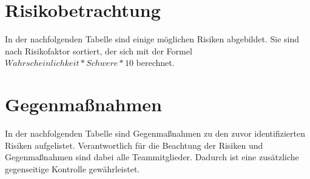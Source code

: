 
\newcommand{\Titel}{Risikoanalyse}


\section{Risikobetrachtung}
In der nachfolgenden Tabelle sind einige möglichen Risiken abgebildet.
Sie sind nach Risikofaktor sortiert, der sich mit der Formel $Wahrscheinlichkeit * Schwere * 10$ berechnet.

\begin{center}
\end{center}

\section{Gegenmaßnahmen}
In der nachfolgenden Tabelle sind Gegenmaßnahmen zu den zuvor identifizierten Risiken aufgelistet.
Verantwortlich für die Beachtung der Risiken und Gegenmaßnahmen sind dabei alle Teammitglieder.
Dadurch ist eine zusätzliche gegenseitige Kontrolle gewährleistet.

\begin{center}
\end{center}
